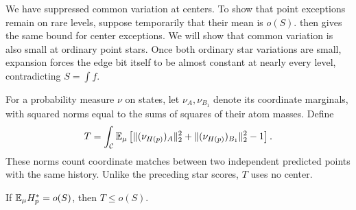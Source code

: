We have suppressed common variation at centers. To show that point exceptions
remain on rare levels, suppose temporarily that their mean is \(o(S)\).
 then gives the same bound for center exceptions. We will
show that common variation is also small at ordinary point stars. Once both
ordinary star variations are small, expansion forces the edge bit itself to
be almost constant at nearly every level, contradicting \(S=\int f\).

For a probability measure \(\nu\) on states, let \(\nu_A,\nu_{B_1}\) denote
its coordinate marginals, with squared norms equal to the sums of squares of
their atom masses. Define
\begin{equation}\label{com:T}
 T=\int_{\mathcal C}\mathbb E_\mu\left[
       \lVert (\nu_{H(p)})_A\rVert_2^2+
       \lVert (\nu_{H(p)})_{B_1}\rVert_2^2-1\right].
\end{equation}
These norms count coordinate matches between two independent predicted
points with the same history. Unlike the preceding star scores, \(T\) uses
no center.

\begin{lemma}\label{com:prediction-score}
If \(\mathbb E_\mu H_p^*=o(S)\), then \(T\le o(S)\).
\end{lemma}

